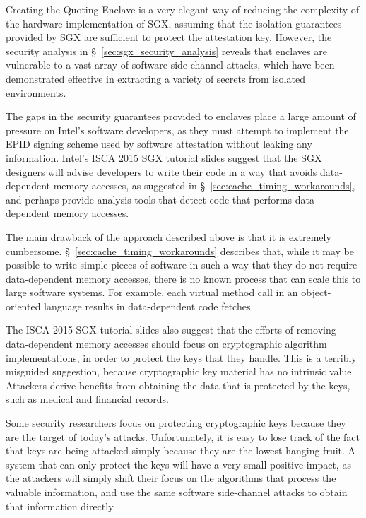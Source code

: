 Creating the Quoting Enclave is a very elegant way of reducing the complexity
of the hardware implementation of SGX, assuming that the isolation guarantees
provided by SGX are sufficient to protect the attestation key. However, the
security analysis in \S~\ref{sec:sgx_security_analysis} reveals that enclaves
are vulnerable to a vast array of software side-channel attacks, which have
been demonstrated effective in extracting a variety of secrets from isolated
environments.


The gaps in the security guarantees provided to enclaves place a large amount
of pressure on Intel's software developers, as they must attempt to implement
the EPID signing scheme used by software attestation without leaking any
information. Intel's ISCA 2015 SGX tutorial slides suggest that the SGX
designers will advise developers to write their code in a way that avoids
data-dependent memory accesses, as suggested in
\S~\ref{sec:cache_timing_workarounds}, and perhaps provide analysis tools that
detect code that performs data-dependent memory accesses.

The main drawback of the approach described above is that it is extremely
cumbersome. \S~\ref{sec:cache_timing_workarounds} describes that, while it may
be possible to write simple pieces of software in such a way that they do not
require data-dependent memory accesses, there is no known process that can
scale this to large software systems. For example, each virtual method call in
an object-oriented language results in data-dependent code fetches.

The ISCA 2015 SGX tutorial slides also suggest that the efforts of removing
data-dependent memory accesses should focus on cryptographic algorithm
implementations, in order to protect the keys that they handle. This is a
terribly misguided suggestion, because cryptographic key material has no
intrinsic value. Attackers derive benefits from obtaining the data that is
protected by the keys, such as medical and financial records.

Some security researchers focus on protecting cryptographic keys because they
are the target of today's attacks. Unfortunately, it is easy to lose track of
the fact that keys are being attacked simply because they are the lowest
hanging fruit. A system that can only protect the keys will have a very small
positive impact, as the attackers will simply shift their focus on the
algorithms that process the valuable information, and use the same software
side-channel attacks to obtain that information directly.

